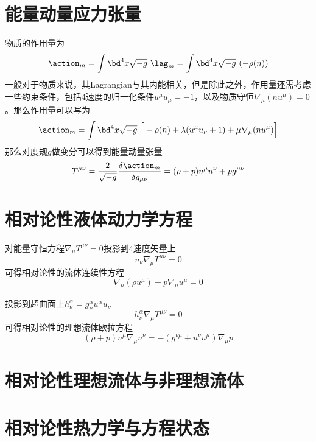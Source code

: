 \documentclass[a4paper]{report}
\begin{document}
\section{能量动量应力张量} 
物质的作用量为
\begin{equation}
    \action_m = \int \bd^4 x\sqrt{-g}~\lag_m = \int \bd^4 x\sqrt{-g}~(-\rho(n))
\end{equation}
一般对于物质来说，其Lagrangian与其内能相关，但是除此之外，作用量还需考虑一些约束条件，包括4速度的归一化条件$u^\mu u_\mu = -1$，以及物质守恒$\nabla_\mu(n u^\mu)=0$。那么作用量可以写为
\begin{equation}
    \action_m =  \int \bd^4 x\sqrt{-g}~\Big[-\rho(n) +\lambda(u^\mu u_\nu +1) + \mu \nabla_\mu(n u^\mu) \Big]
\end{equation}
那么对度规$g$做变分可以得到能量动量张量
\begin{equation}
    T^{\mu\nu} = \frac{2}{\sqrt{-g}}\frac{\delta \action_m}{\delta g_{\mu\nu}} = (\rho + p)u^\mu u^\nu +p g^{\mu\nu}
\end{equation}
\section{相对论性液体动力学方程}
对能量守恒方程$\nabla_\mu T^{\mu\nu}=0$投影到4速度矢量上
\begin{equation}
    u_\nu \nabla_\mu T^{\mu\nu}=0
\end{equation}
可得相对论性的流体连续性方程
\begin{equation}
    \nabla_\mu (\rho u^\mu) + p \nabla_\mu u^\mu =0
\end{equation}

投影到超曲面上$h^\alpha_\nu = g^\alpha_\nu u^\alpha u_\nu$
\begin{equation}
    h^\alpha_\nu \nabla_\mu T^{\mu\nu}=0
\end{equation}
可得相对论性的理想流体欧拉方程
\begin{equation}
    (\rho + p)u^\mu \nabla_\mu u^\nu = -(g^{\nu\mu}+u^\nu u^\mu)\nabla_\mu p
\end{equation}


\section{相对论性理想流体与非理想流体}
\section{相对论性热力学与方程状态}
\end{document}
